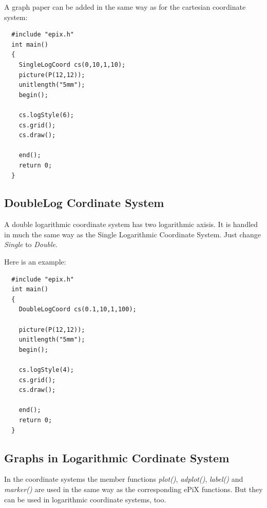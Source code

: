\documentclass[12pt,a4paper]{article}
\begin{document}
  \newpage
  A graph paper can be added in the same way as for the cartesian coordinate
  system:

  \begin{minipage}{7.5cm}
    \begin{lstlisting}
  #include "epix.h"
  int main()
  {
    SingleLogCoord cs(0,10,1,10);
    picture(P(12,12));
    unitlength("5mm");
    begin();

    cs.logStyle(6);
    cs.grid();
    cs.draw();

    end();
    return 0;
  }
    \end{lstlisting}
  \end{minipage}
  \begin{minipage}{5.5cm}
    
  \end{minipage}

  \subsection{DoubleLog Cordinate System}

  A double logarithmic coordinate system has two logarithmic axisis. It is
  handled in much the same way as the Single Logarithmic Coordinate System.
  Just change \textit{Single} to \textit{Double}.

  Here is an example:

  \begin{minipage}{7.7cm}
    \begin{lstlisting}
  #include "epix.h"
  int main()
  {
    DoubleLogCoord cs(0.1,10,1,100);

    picture(P(12,12));
    unitlength("5mm");
    begin();

    cs.logStyle(4);
    cs.grid();
    cs.draw();

    end();
    return 0;
  }
    \end{lstlisting}
  \end{minipage}
  \begin{minipage}{5.5cm}
    
  \end{minipage}

  \subsection{Graphs in Logarithmic Cordinate System}

  In the coordinate systems the member functions \textit{plot()}, \textit{adplot()},
  \textit{label()} and \textit{marker()} are used in the same way as the
  corresponding ePiX functions. But they can be used in  logarithmic coordinate
  systems, too.
\end{document}
